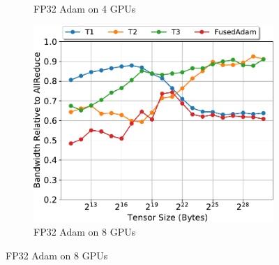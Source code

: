 \begin{figure}
\begin{subfigure}{0.66\columnwidth}
    \caption{FP32 Adam on 4 GPUs}
  \end{subfigure}
   \begin{subfigure}{0.66\columnwidth}
    \includegraphics[width=\columnwidth]{figures/results-adam-8-gpus.pdf}  
    \caption{FP32 Adam on 8 GPUs}
  \end{subfigure}


\end{figure}
